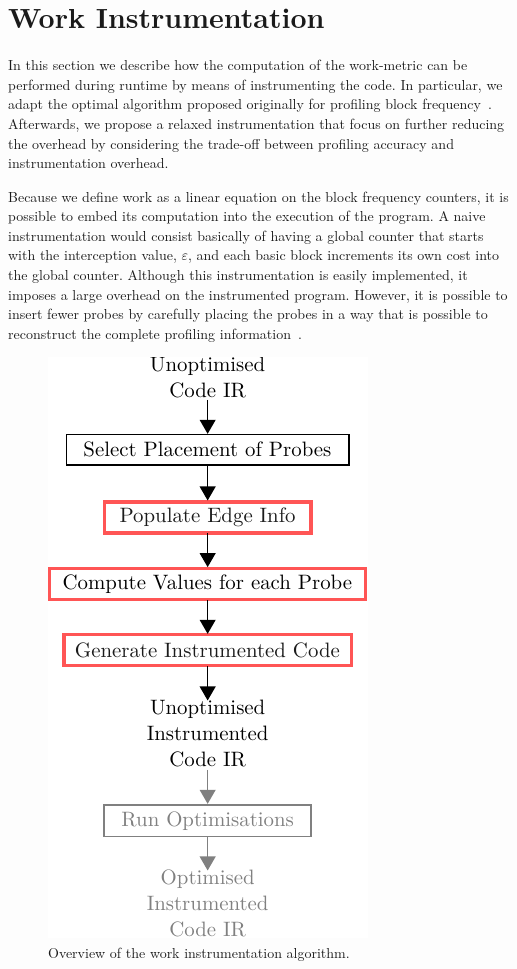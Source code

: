 \chapter{Work Instrumentation} \label{chap:instr}

In this section we describe how the computation of the work-metric can be performed during runtime by means of instrumenting the code.
In particular, we adapt the optimal algorithm proposed originally for profiling block frequency~\citep{nahapetian73,knuth73,ball94}.
Afterwards, we propose a relaxed instrumentation that focus on further reducing the overhead by considering the trade-off between profiling accuracy and instrumentation overhead.

Because we define work as a linear equation on the block frequency counters, it is possible to embed its computation into the execution of the program.
A naive instrumentation would consist basically of having a global counter that starts with the interception value, $\varepsilon$, and each basic block increments its own cost into the global counter.
Although this instrumentation is easily implemented, it imposes a large overhead on the instrumented program.
However, it is possible to insert fewer probes by carefully placing the probes in a way that is possible to reconstruct the complete profiling information~\cite{knuth73,ball94}.

\begin{figure}[h]
  \centering
  \includegraphics[scale=0.9]{figs/instr-diagram.pdf}
  \caption{Overview of the work instrumentation algorithm.}
  \label{fig:instr-diagram}
\end{figure}


